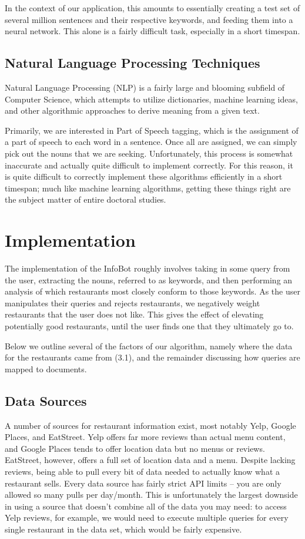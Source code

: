 \documentclass{article}
\begin{document}
        In the context of our application, this amounts to essentially creating a test set of several million sentences and their respective keywords, and feeding them into a neural network. This alone is a fairly difficult task, especially in a short timespan.
        
    \subsection{Natural Language Processing Techniques}
        Natural Language Processing (NLP) is a fairly large and blooming subfield of Computer Science, which attempts to utilize dictionaries, machine learning ideas, and other algorithmic approaches to derive meaning from a given text.
        
        Primarily, we are interested in Part of Speech tagging, which is the assignment of a part of speech to each word in a sentence. Once all are assigned, we can simply pick out the nouns that we are seeking. Unfortunately, this process is somewhat inaccurate and actually quite difficult to implement correctly\cite{postagging}. For this reason, it is quite difficult to correctly implement these algorithms efficiently in a short timespan; much like machine learning algorithms, getting these things right are the subject matter of entire doctoral studies.

\section{Implementation}
    The implementation of the InfoBot roughly involves taking in some query from the user, extracting the nouns, referred to as keywords, and then performing an analysis of which restaurants most closely conform to those keywords. As the user manipulates their queries and rejects restaurants, we negatively weight restaurants that the user does not like. This gives the effect of elevating potentially good restaurants, until the user finds one that they ultimately go to.
    
    Below we outline several of the factors of our algorithm, namely where the data for the restaurants came from (3.1), and the remainder discussing how queries are mapped to documents.
    
    \subsection{Data Sources}
        A number of sources for restaurant information exist, most notably Yelp, Google Places, and EatStreet. Yelp offers far more reviews than actual menu content, and Google Places tends to offer location data but no menus or reviews. EatStreet, however, offers a full set of location data and a menu. Despite lacking reviews, being able to pull every bit of data needed to actually know what a restaurant sells. Every data source has fairly strict API limits -- you are only allowed so many pulls per day/month. This is unfortunately the largest downside in using a source that doesn't combine all of the data you may need: to access Yelp reviews, for example, we would need to execute multiple queries for every single restaurant in the data set, which would be fairly expensive.
        
\end{document}

